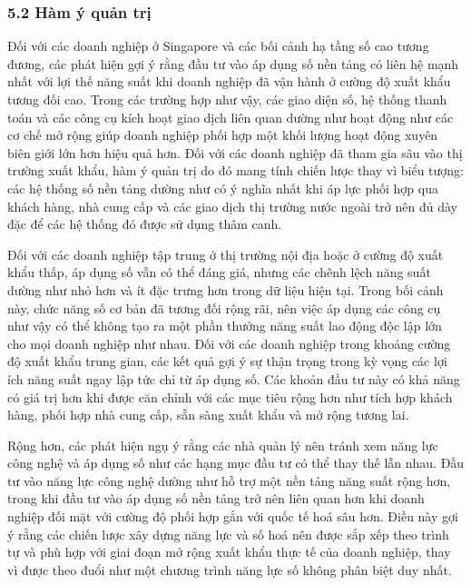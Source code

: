 \documentclass[12pt,a4paper]{article}
\begin{document}
\hypertarget{52-huxe0m-uxfd-quux1ea3n-trux1ecb}{%
\subsubsection{5.2 Hàm ý quản
trị}\label{52-huxe0m-uxfd-quux1ea3n-trux1ecb}}

Đối với các doanh nghiệp ở Singapore và các bối cảnh hạ tầng số cao
tương đương, các phát hiện gợi ý rằng đầu tư vào áp dụng số nền tảng có
liên hệ mạnh nhất với lợi thế năng suất khi doanh nghiệp đã vận hành ở
cường độ xuất khẩu tương đối cao. Trong các trường hợp như vậy, các giao
diện số, hệ thống thanh toán và các công cụ kích hoạt giao dịch liên
quan dường như hoạt động như các cơ chế mở rộng giúp doanh nghiệp phối
hợp một khối lượng hoạt động xuyên biên giới lớn hơn hiệu quả hơn. Đối
với các doanh nghiệp đã tham gia sâu vào thị trường xuất khẩu, hàm ý
quản trị do đó mang tính chiến lược thay vì biểu tượng: các hệ thống số
nền tảng dường như có ý nghĩa nhất khi áp lực phối hợp qua khách hàng,
nhà cung cấp và các giao dịch thị trường nước ngoài trở nên đủ dày đặc
để các hệ thống đó được sử dụng thâm canh.

Đối với các doanh nghiệp tập trung ở thị trường nội địa hoặc ở cường độ
xuất khẩu thấp, áp dụng số vẫn có thể đáng giá, nhưng các chênh lệch
năng suất dường như nhỏ hơn và ít đặc trưng hơn trong dữ liệu hiện tại.
Trong bối cảnh này, chức năng số cơ bản đã tương đối rộng rãi, nên việc
áp dụng các công cụ như vậy có thể không tạo ra một phần thưởng năng
suất lao động độc lập lớn cho mọi doanh nghiệp như nhau. Đối với các
doanh nghiệp trong khoảng cường độ xuất khẩu trung gian, các kết quả gợi
ý sự thận trọng trong kỳ vọng các lợi ích năng suất ngay lập tức chỉ từ
áp dụng số. Các khoản đầu tư này có khả năng có giá trị hơn khi được căn
chỉnh với các mục tiêu rộng hơn như tích hợp khách hàng, phối hợp nhà
cung cấp, sẵn sàng xuất khẩu và mở rộng tương lai.

Rộng hơn, các phát hiện ngụ ý rằng các nhà quản lý nên tránh xem năng
lực công nghệ và áp dụng số như các hạng mục đầu tư có thể thay thế lẫn
nhau. Đầu tư vào năng lực công nghệ dường như hỗ trợ một nền tảng năng
suất rộng hơn, trong khi đầu tư vào áp dụng số nền tảng trở nên liên
quan hơn khi doanh nghiệp đối mặt với cường độ phối hợp gắn với quốc tế
hoá sâu hơn. Điều này gợi ý rằng các chiến lược xây dựng năng lực và số
hoá nên được sắp xếp theo trình tự và phù hợp với giai đoạn mở rộng xuất
khẩu thực tế của doanh nghiệp, thay vì được theo đuổi như một chương
trình năng lực số không phân biệt duy nhất.
\end{document}

